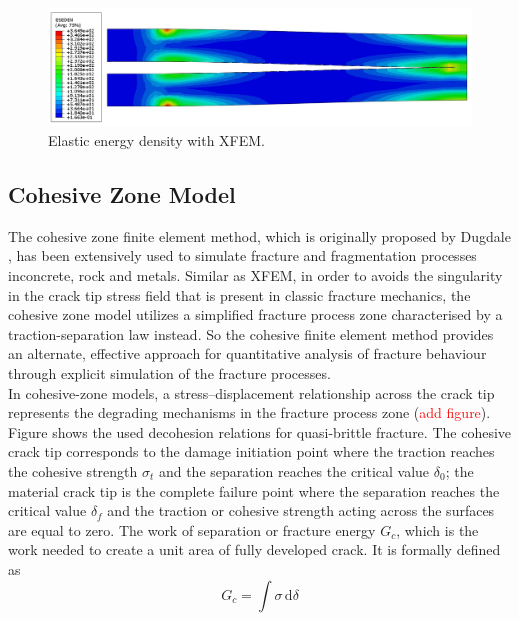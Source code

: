 \documentclass[preprint,review,12pt]{elsarticle}
\newcommand{\ud}{\textrm{d}}
\begin{document}
\
\\
\begin{figure}[htbp]
   \centering
  \includegraphics[width=\textwidth]{Abaqus/XFEM/XFEM_ESEDEN.jpg}
   \caption{Elastic energy density with XFEM. }
   \label{fig:XFEMESEDEN}
\end{figure}
\subsection{Cohesive Zone Model}
\noindent
The cohesive zone finite element method, which is originally proposed by Dugdale \cite{Dugdale1960}, has been extensively used to simulate fracture and fragmentation processes inconcrete, rock and metals. Similar as XFEM, in order to avoids the singularity in the crack tip stress field that is present in classic fracture mechanics, the cohesive zone model utilizes a simplified fracture process zone characterised by a traction-separation law instead. So the cohesive finite element method provides an alternate, effective approach for quantitative analysis of fracture behaviour through explicit simulation of the fracture processes.
\
\\
In cohesive-zone models,  a stress–displacement relationship across the crack tip represents the degrading mechanisms in the fracture process zone (\textcolor{red}{add figure}). Figure shows the used decohesion relations for quasi-brittle fracture. The cohesive crack tip corresponds to the damage initiation point where the traction reaches the cohesive strength $\sigma_t$ and the separation reaches the critical value $\delta_0$; the material crack tip is the complete failure point where the separation reaches the critical value $\delta_f$ and the traction or cohesive strength acting across the surfaces are equal to zero. The work of separation or fracture energy $G_c$, which is the work needed to create a unit area of fully developed crack. It is formally defined as
%
\begin{equation}
\label{eq:CZMGc}
    G_c = \int \sigma \,\ud{\delta}
\end{equation}
\end{document}
